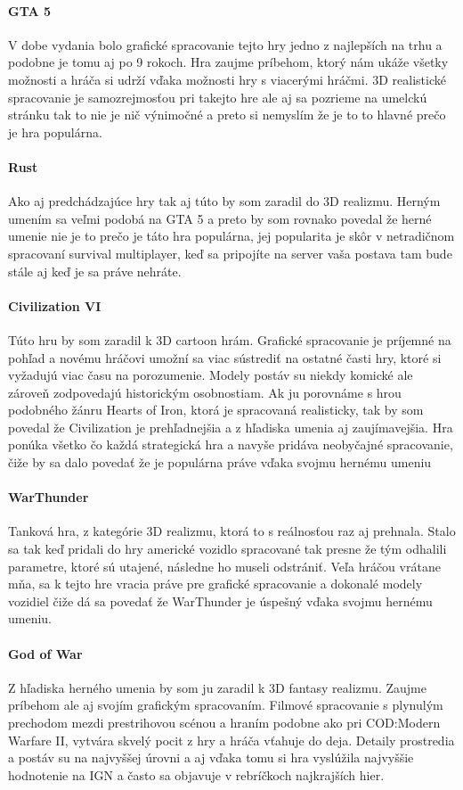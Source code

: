 \documentclass[10pt,twoside,slovak,a4paper]{article}
\begin{document}
\paragraph{GTA 5}
V dobe vydania bolo grafické spracovanie tejto hry jedno z najlepších na trhu a podobne je tomu aj po 9 rokoch. Hra zaujme príbehom, ktorý nám ukáže všetky možnosti a hráča si udrží vďaka možnosti hry s viacerými hráčmi. 3D realistické spracovanie je samozrejmosťou pri takejto hre ale aj sa pozrieme na umelckú stránku tak to nie je nič výnimočné a preto si nemyslím že je to to hlavné prečo je hra populárna.
\paragraph{Rust}
Ako aj predchádzajúce hry tak aj túto by som zaradil do 3D realizmu. Herným umením sa veľmi podobá na GTA 5 a preto by som rovnako povedal že herné umenie nie je to prečo je táto hra populárna, jej popularita je skôr v netradičnom spracovaní survival multiplayer, keď sa pripojíte na server vaša postava tam bude stále aj keď je sa práve nehráte.
\paragraph{Civilization VI}
Túto hru by som zaradil k 3D cartoon hrám. Grafické spracovanie je príjemné na pohľad a novému hráčovi umožní sa viac sústrediť na ostatné časti hry, ktoré si vyžadujú viac času na porozumenie. Modely postáv su niekdy komické ale zároveň zodpovedajú historickým osobnostiam. Ak ju porovnáme s hrou podobného žánru Hearts of Iron, ktorá je spracovaná realisticky, tak by som povedal že Civilization je prehľadnejšia a z hľadiska umenia aj zaujímavejšia. Hra ponúka všetko čo každá strategická hra a navyše pridáva neobyčajné spracovanie, čiže by sa dalo povedať že je populárna práve vďaka svojmu hernému umeniu

\paragraph{WarThunder}
Tanková hra, z kategórie 3D realizmu, ktorá to s reálnosťou raz aj prehnala. Stalo sa tak keď pridali do hry americké vozidlo spracované tak presne že tým odhalili parametre, ktoré sú utajené, následne ho museli odstrániť. Veľa hráčou vrátane mňa, sa k tejto hre vracia práve pre grafické spracovanie a dokonalé modely vozidiel čiže dá sa povedať že WarThunder je úspešný vďaka svojmu hernému umeniu. 

\paragraph{God of War}
Z hľadiska herného umenia by som ju zaradil k 3D fantasy realizmu. Zaujme príbehom ale aj svojím grafickým spracovaním. Filmové spracovanie s plynulým prechodom mezdi prestrihovou scénou a hraním podobne ako pri COD:Modern Warfare II, vytvára skvelý pocit z hry a hráča vťahuje do deja. Detaily prostredia a postáv su na najvyššej úrovni a aj vďaka tomu si hra vyslúžila najvyššie hodnotenie na IGN \cite{re} a často sa objavuje v rebríčkoch najkrajších hier. 
\end{document}
